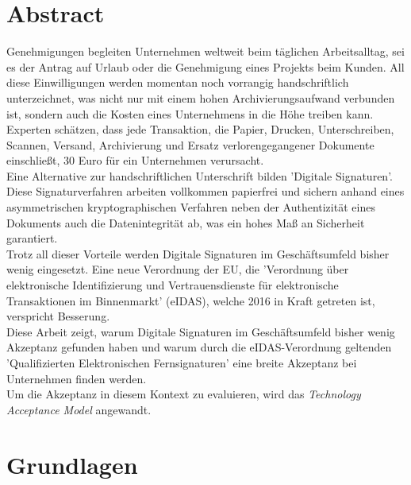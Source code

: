 \documentclass[deutsch]{lib/llncs/llncs}
\begin{document}
\section{Abstract}
Genehmigungen begleiten Unternehmen weltweit beim täglichen Arbeitsalltag, sei es der Antrag auf Urlaub oder die Genehmigung eines Projekts beim Kunden. All diese Einwilligungen werden momentan noch vorrangig handschriftlich unterzeichnet, was nicht nur mit einem hohen Archivierungsaufwand verbunden ist, sondern auch die Kosten eines Unternehmens in die Höhe treiben kann. Experten schätzen, dass jede Transaktion, die Papier, Drucken, Unterschreiben, Scannen, Versand, Archivierung und Ersatz verlorengegangener Dokumente einschließt, 30 Euro für ein Unternehmen verursacht. \\
Eine Alternative zur handschriftlichen Unterschrift bilden 'Digitale Signaturen'. Diese Signaturverfahren arbeiten vollkommen papierfrei und sichern anhand eines asymmetrischen kryptographischen Verfahren neben der Authentizität eines Dokuments auch die Datenintegrität ab, was ein hohes Maß an Sicherheit garantiert. \\
Trotz all dieser Vorteile werden Digitale Signaturen im Geschäftsumfeld bisher wenig eingesetzt. Eine neue Verordnung der EU, die 'Verordnung über elektronische Identifizierung und Vertrauensdienste für elektronische Transaktionen im Binnenmarkt' (eIDAS), welche 2016 in Kraft getreten ist, verspricht Besserung. \\
Diese Arbeit zeigt, warum Digitale Signaturen im Geschäftsumfeld bisher wenig Akzeptanz gefunden haben und warum durch die eIDAS-Verordnung geltenden 'Qualifizierten Elektronischen Fernsignaturen' eine breite Akzeptanz bei Unternehmen finden werden. \\
Um die Akzeptanz in diesem Kontext zu evaluieren, wird das \textit{Technology Acceptance Model} angewandt.


\newpage


\section{Grundlagen}
\end{document}
